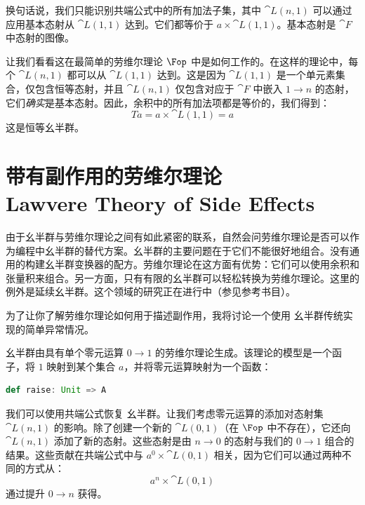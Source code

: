 换句话说，我们只能识别共端公式中的所有加法子集，其中 $\cat{L}(n, 1)$ 可以通过应用基本态射从 $\cat{L}(1, 1)$ 达到。它们都等价于 $a \times \cat{L}(1, 1)$。基本态射是 $\cat{F}$ 中态射的图像。

让我们看看这在最简单的劳维尔理论 $\Fop$ 中是如何工作的。在这样的理论中，每个 $\cat{L}(n, 1)$ 都可以从 $\cat{L}(1, 1)$ 达到。这是因为 $\cat{L}(1, 1)$ 是一个单元素集合，仅包含恒等态射，并且 $\cat{L}(n, 1)$ 仅包含对应于 $\cat{F}$ 中嵌入 $1 \to n$ 的态射，它们\emph{确实}是基本态射。因此，余积中的所有加法项都是等价的，我们得到：
\[T a = a \times \cat{L}(1, 1) = a\]
这是恒等幺半群。

\section{带有副作用的劳维尔理论\\ \textmd{Lawvere Theory of Side Effects}}

由于幺半群与劳维尔理论之间有如此紧密的联系，自然会问劳维尔理论是否可以作为编程中幺半群的替代方案。幺半群的主要问题在于它们不能很好地组合。没有通用的构建幺半群变换器的配方。劳维尔理论在这方面有优势：它们可以使用余积和张量积来组合。另一方面，只有有限的幺半群可以轻松转换为劳维尔理论。这里的例外是延续幺半群。这个领域的研究正在进行中（参见参考书目）。

为了让你了解劳维尔理论如何用于描述副作用，我将讨论一个使用  幺半群传统实现的简单异常情况。

 幺半群由具有单个零元运算 $0 \to 1$ 的劳维尔理论生成。该理论的模型是一个函子，将 $1$ 映射到某个集合 $a$，并将零元运算映射为一个函数：

\begin{lstlisting}[language=Scala]
def raise: Unit => A
\end{lstlisting}
我们可以使用共端公式恢复  幺半群。让我们考虑零元运算的添加对态射集 $\cat{L}(n, 1)$ 的影响。除了创建一个新的 $\cat{L}(0, 1)$（在 $\Fop$ 中不存在），它还向 $\cat{L}(n, 1)$ 添加了新的态射。这些态射是由 $n \to 0$ 的态射与我们的 $0 \to 1$ 组合的结果。这些贡献在共端公式中与 $a^0 \times \cat{L}(0, 1)$ 相关，因为它们可以通过两种不同的方式从：
\[a^n \times \cat{L}(0, 1)\]
通过提升 $0 \to n$ 获得。

\begin{figure}[H]
  \centering
\end{figure}

